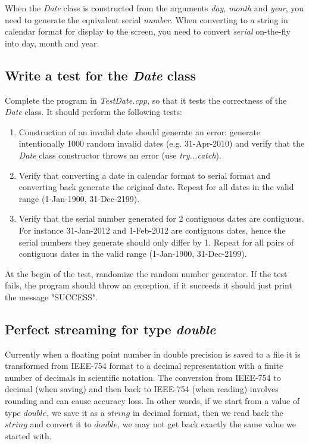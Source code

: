 \documentclass[10pt]{article}
\begin{document}
When the \textit{Date} class is constructed from the arguments \textit{day}, \textit{month} and \textit{year}, you need to generate the equivalent serial \textit{number}. When converting to a string in calendar format for display to the screen, you need to convert \textit{serial} on-the-fly into day, month and year.


\subsection{Write a test for the \textit{Date} class}
Complete the program in \textit{TestDate.cpp}, so that it tests the correctness of the \textit{Date} class. It should perform the following tests:
\begin{enumerate}
\item Construction of an invalid date should generate an error: generate intentionally 1000 random invalid dates (e.g. 31-Apr-2010) and verify that the \textit{Date} class constructor throws an error (use \textit{try...catch}).
\item Verify that converting a date in calendar format to serial format and converting back generate the original date. Repeat for all dates in the valid range (1-Jan-1900, 31-Dec-2199).
\item Verify that the serial number generated for 2 contiguous dates are contiguous. For instance 31-Jan-2012 and 1-Feb-2012 are contiguous dates, hence the serial numbers they generate should only differ by 1. Repeat for all pairs of contiguous dates in the valid range (1-Jan-1900, 31-Dec-2199).
\end{enumerate}
At the begin of the test, randomize the random number generator. If the test fails, the program should throw an exception, if it succeeds it should just print the message "SUCCESS".

\subsection{Perfect streaming for type \textit{double}}
Currently when a floating point number in double precision is saved to a file it is transformed from IEEE-754 format to a decimal representation with a finite number of decimals in scientific notation. The conversion from IEEE-754 to decimal (when saving) and then back to IEEE-754 (when reading) involves rounding and can cause accuracy loss. In other words, if we start from a value of type $double$, we save it as a $string$ in decimal format, then we read back the $string$ and convert it to $double$, we may not get back exactly the same value we started with.
\end{document}
